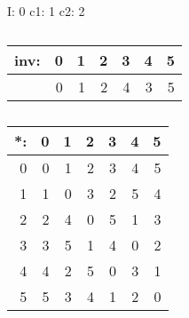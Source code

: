 \begin{table}[H]  \centering %
I: 0 \hspace{.5cm}
c1: 1 \hspace{.5cm}
c2: 2 \hspace{.5cm}
\begin{tabular}{r|rrrrrr}
inv: & 0 & 1 & 2 & 3 & 4 & 5\\
\hline
   & 0 & 1 & 2 & 4 & 3 & 5
\end{tabular} \hspace{.5cm}
\begin{tabular}{r|rrrrrr}
*: & 0 & 1 & 2 & 3 & 4 & 5\\
\hline
    0 & 0 & 1 & 2 & 3 & 4 & 5 \\
    1 & 1 & 0 & 3 & 2 & 5 & 4 \\
    2 & 2 & 4 & 0 & 5 & 1 & 3 \\
    3 & 3 & 5 & 1 & 4 & 0 & 2 \\
    4 & 4 & 2 & 5 & 0 & 3 & 1 \\
    5 & 5 & 3 & 4 & 1 & 2 & 0
\end{tabular}
\caption{ }
\end{table}
